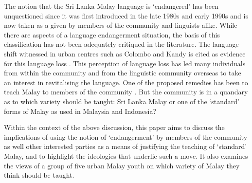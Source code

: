 The notion that the Sri Lanka Malay language is `endangered' has been unquestioned since it was first introduced in the late 1980s and early 1990s \citep{Hussainmiya1987,Saldin2001} and is now taken as a given by members of the community and linguists alike. While there are aspects of a language endangerment situation, the basis of this classification has not been adequately critiqued in the literature. The language shift witnessed in urban centres such as Colombo and Kandy is cited as evidence for this language loss \citep{Ansaldo2008genesis,AnsaldoEtAl2006,LimEtAl2007}. This perception of language loss has led many individuals from within the community and from the linguistic community overseas to take an interest in revitalising the language. One of the proposed remedies has been to teach Malay to members of the community \citep{Saldin2001,Saldin2000}. But the community is in a quandary as to which variety should be taught: Sri Lanka Malay or one of the `standard' forms of Malay as used in Malaysia and Indonesia?

Within the context of the above discussion, this paper aims to discuss the implications of using the notion of `endangerment' by members of the community as well other interested parties as a means of justifying the teaching of `standard' Malay, and to highlight the ideologies that underlie such a move. It also examines the views of a group of five urban Malay youth on which variety of Malay they think should be taught. 

